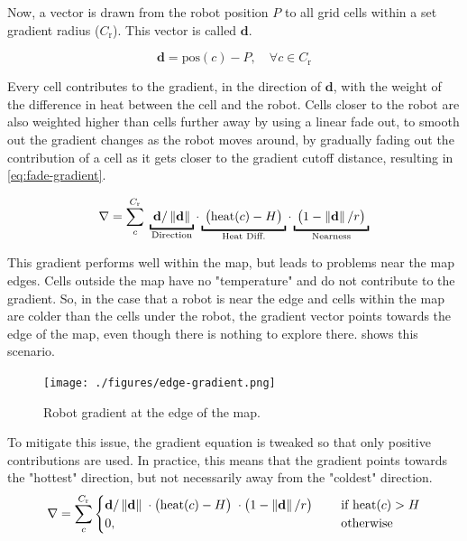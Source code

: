 Now, a vector is drawn from the robot position $P$ to all grid cells within a set gradient radius ($C_\mathrm{r}$). This vector is called $\mathbf{d}$.

\begin{equation}
    \mathbf{d} = \mathrm{pos}(c) - P, \quad \forall c \in C_\mathrm{r}
\end{equation}

Every cell contributes to the gradient, in the direction of $\mathbf{d}$, with the weight of the difference in heat between the cell and the robot. Cells closer to the robot are also weighted higher than cells further away by using a linear fade out, to smooth out the gradient changes as the robot moves around, by gradually fading out the contribution of a cell as it gets closer to the gradient cutoff distance, resulting in \cref{eq:fade-gradient}.

\begin{equation}
    \nabla = \sum_c^{C_\mathrm{r}} \;
    \underbracket{\; \mathbf{d}/\norm{\mathbf{d}}      \;}_\text{\makebox[0pt]{Direction}} \cdot
    \underbracket{\; \big(\mathrm{heat}(c) - H\big)    \;}_\text{Heat Diff.} \cdot
    \underbracket{\; \big(1 - \norm{\mathbf{d}}/r\big) \;}_\text{Nearness}
    \label{eq:fade-gradient}
\end{equation}

This gradient performs well within the map, but leads to problems near the map edges. Cells outside the map have no "temperature" and do not contribute to the gradient. {\color{red}So}, in the case that a robot is near the edge and cells within the map are colder than the cells under the robot, the gradient vector points towards the edge of the map, even though there is nothing to explore there.  shows this scenario.
\begin{figure}[h]
    \begin{center}
        \texttt{[image: ./figures/edge-gradient.png]}
    \end{center}
    \caption{Robot gradient at the edge of the map.}
    \label{fig:edge-gradient}
\end{figure}

To mitigate this issue, the gradient equation is tweaked so that only positive contributions are used. In practice, this means that the gradient points towards the "hottest" direction, but not necessarily away from the "coldest" direction.
\begin{equation}
\label{eq:robot-gradient}
    \nabla = \sum_c^{C_\mathrm{r}}
    \begin{cases}
        \mathbf{d}/\left\lVert\mathbf{d}\right\rVert      \; \cdot
        \big(\mathrm{heat}(c) - H\big)    \; \cdot
        \big(1 - \left\lVert\mathbf{d}\right\rVert/r\big) \; \quad &\text{if } \mathrm{heat}(c) > H
        \\
        0, \quad &\text{otherwise}
    \end{cases}
\end{equation}

